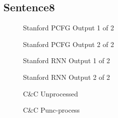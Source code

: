 \documentclass{article}
\begin{document}
\begin{landscape}

\section{Sentence8}
\begin{figure}[!h]
    \center{%
        \resizebox{1.2\textwidth}{!}{}
    }
    \caption{Stanford PCFG Output 1 of 2}
\end{figure}
\begin{figure}[!h]
    \center{%
        \resizebox{0.8\textwidth}{!}{}
    }
    \caption{Stanford PCFG Output 2 of 2}
\end{figure}
\begin{figure}[!h]
    \center{%
        \resizebox{1.2\textwidth}{!}{}
    }
    \caption{Stanford RNN Output 1 of 2}
\end{figure}
\begin{figure}[!h]
    \center{%
        \resizebox{0.8\textwidth}{!}{}
    }
    \caption{Stanford RNN Output 2 of 2}
\end{figure}

\pagebreak
\begin{figure}[!h]
    \center{%
        \resizebox{1.2\textwidth}{!}{}
    }
	\caption{C\&C Unprocessed}
\end{figure}

\begin{figure}[!h]
    \center{%
        \resizebox{1.2\textwidth}{!}{}
    }
	\caption{C\&C Punc-process}
\end{figure}
\end{landscape}
\pagebreak
\end{document}
